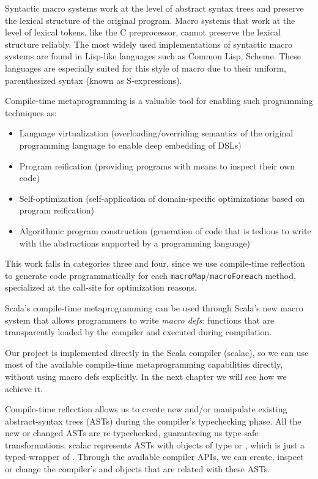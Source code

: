 Syntactic macro systems work at the level of abstract syntax trees and preserve
the lexical structure of the original program. Macro systems that work at the
level of lexical tokens, like the C preprocessor, cannot preserve the
lexical structure reliably. The most widely used implementations of syntactic
macro systems are found in Lisp-like languages such as Common Lisp, Scheme. 
These languages are especially suited for this style of macro due to their uniform,
parenthesized syntax (known as S-expressions).

Compile-time metaprogramming is a valuable tool for enabling such programming
techniques as:

\begin{itemize}
  \item
    Language virtualization (overloading/overriding semantics of the original
    programming language to enable deep embedding of DSLs)
  \item
    Program reification (providing programs with means to inspect their own code)
  \item
     Self-optimization (self-application of domain-specific optimizations based on
program reification)
  \item
    Algorithmic program construction (generation of code that is tedious to write
    with the abstractions supported by a programming language)
\end{itemize}

This work falls in categories three and four, since we use compile-time
reflection to generate code programmatically for each \texttt{macroMap}/\texttt{macroForeach}
method, specialized at the call-site for optimization reasons.

Scala's compile-time metaprogramming can be used through Scala's new macro
system that allows programmers to write \emph{macro defs}: functions that are
transparently loaded by the compiler and executed during compilation.

Our project is implemented directly in the Scala compiler (scalac), so we can
use most of the available compile-time metaprogramming capabilities directly,
without using macro defs explicitly. In the next chapter we will see how we
achieve it.

Compile-time reflection allows us to create new and/or manipulate
existing abstract-syntax trees (ASTs)  during the compiler's typechecking phase.
All the new or changed ASTs are re-typechecked, guaranteeing us type-safe
transformations. scalac represents ASTs with objects of type
 or , which is just a typed-wrapper
of . Through the available compiler APIs, we can create,
inspect or change the compiler's  and
 objects that are related with these ASTs.

